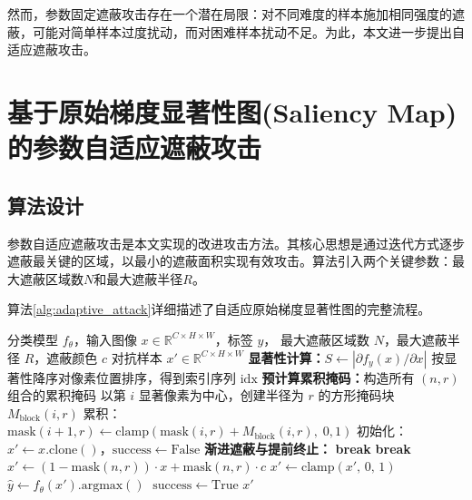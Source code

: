 然而，参数固定遮蔽攻击存在一个潜在局限：对不同难度的样本施加相同强度的遮蔽，可能对简单样本过度扰动，而对困难样本扰动不足。为此，本文进一步提出自适应遮蔽攻击。


\section{基于原始梯度显著性图(Saliency Map)的参数自适应遮蔽攻击}

\subsection{算法设计}

参数自适应遮蔽攻击是本文实现的改进攻击方法。其核心思想是通过迭代方式逐步遮蔽最关键的区域，以最小的遮蔽面积实现有效攻击。算法引入两个关键参数：最大遮蔽区域数$N$和最大遮蔽半径$R$。

算法\ref{alg:adaptive_attack}详细描述了自适应原始梯度显著性图的完整流程。

\begin{algorithm}[htbp]
  \caption{参数自适应遮蔽攻击}
  \label{alg:adaptive_attack}
  \begin{algorithmic}[1]
    \Require 分类模型 $f_{\theta}$，输入图像 $x \in \mathbb{R}^{C \times H \times W}$，标签 $y$，
             最大遮蔽区域数 $N$，最大遮蔽半径 $R$，遮蔽颜色 $c$
    \Ensure 对抗样本 $x' \in \mathbb{R}^{C \times H \times W}$
    \State \textbf{显著性计算：}$S \leftarrow \left|\partial f_y(x)/\partial x\right|$
    \State 按显著性降序对像素位置排序，得到索引序列 $\mathrm{idx}$
    \State \textbf{预计算累积掩码：}构造所有 $(n, r)$ 组合的累积掩码
        \State 以第 $i$ 显著像素为中心，创建半径为 $r$ 的方形掩码块 $M_{\mathrm{block}}(i,r)$
        \State 累积：$\mathrm{mask}(i{+}1, r) \leftarrow \mathrm{clamp}\!\left(\mathrm{mask}(i, r) + M_{\mathrm{block}}(i,r),\; 0, 1\right)$
      \EndFor
    \EndFor
    \State 初始化：$x' \leftarrow x.\mathrm{clone}()$，$\mathrm{success} \leftarrow \mathrm{False}$
    \State \textbf{渐进遮蔽与提前终止：}
       \textbf{break} \EndIf
         \textbf{break} \EndIf
        \State $x' \leftarrow \left(1 - \mathrm{mask}(n,r)\right) \cdot x + \mathrm{mask}(n,r) \cdot c$
        \State $x' \leftarrow \mathrm{clamp}(x',\, 0,\, 1)$
        \State $\hat{y} \leftarrow f_{\theta}(x').\mathrm{argmax}()$
         $\;\mathrm{success} \leftarrow \mathrm{True}$ \EndIf
      \EndFor
    \EndFor
    \State \Return $x'$
  \end{algorithmic}
\end{algorithm}

